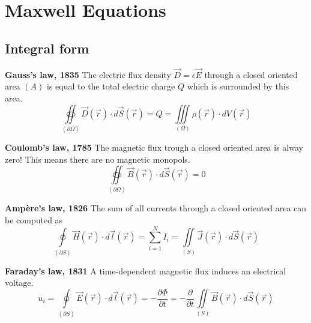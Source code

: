 \section{Maxwell Equations}

\subsection{Integral form}
\begin{multicols}{2}
	\textbf{Gauss's law, 1835\newline}
	\noindent The electric flux density $\vec{D} = \epsilon \vec{E}$ through a closed oriented area $(A)$ is equal to the total electric charge $Q$ which is surrounded by this area.
	\begin{equation}
		\oiint\limits_{\left(\partial\Omega\right)} \vec{D}\left(\vec{r}\right)\cdot d\vec{S}\left(\vec{r}\right) = Q = \iiint\limits_{\left(\Omega\right)}\rho\left(\vec{r}\right)\cdot dV\left(\vec{r}\right)
	\end{equation}
	
	\textbf{Coulomb's law, 1785\newline}
	\noindent The magnetic flux trough a closed oriented area is alway zero! This means there are no magnetic monopols.
	\begin{equation}
		\oiint\limits_{\left(\partial\Omega\right)} \vec{B}\left(\vec{r}\right)\cdot d\vec{S}\left(\vec{r}\right) = 0
	\end{equation}
	
	\textbf{Ampère's law, 1826\newline}
	The sum of all currents through a closed oriented area can be computed as
	\begin{equation}
		\oint\limits_{\left(\partial S\right)} \vec{H}\left(\vec{r}\right)\cdot d\vec{l}\left(\vec{r}\right) = \sum_{i=1}^{N} I_i = \iint\limits_{\left(S\right)}\vec{J}\left(\vec{r}\right)\cdot d\vec{S}\left(\vec{r}\right)
	\end{equation}
	
	\textbf{Faraday's law, 1831\newline}
	A time-dependent magnetic flux induces an electrical voltage.
	\begin{equation}
		u_i = \oint\limits_{\left(\partial S\right)} \vec{E}\left(\vec{r}\right)\cdot d\vec{l}\left(\vec{r}\right) = -\frac{\partial \Phi}{\partial t} = -\frac{\partial}{\partial t} \iint\limits_{\left(S\right)} \vec{B}\left(\vec{r}\right)\cdot d\vec{S}\left(\vec{r}\right) 
	\end{equation}
\end{multicols}

